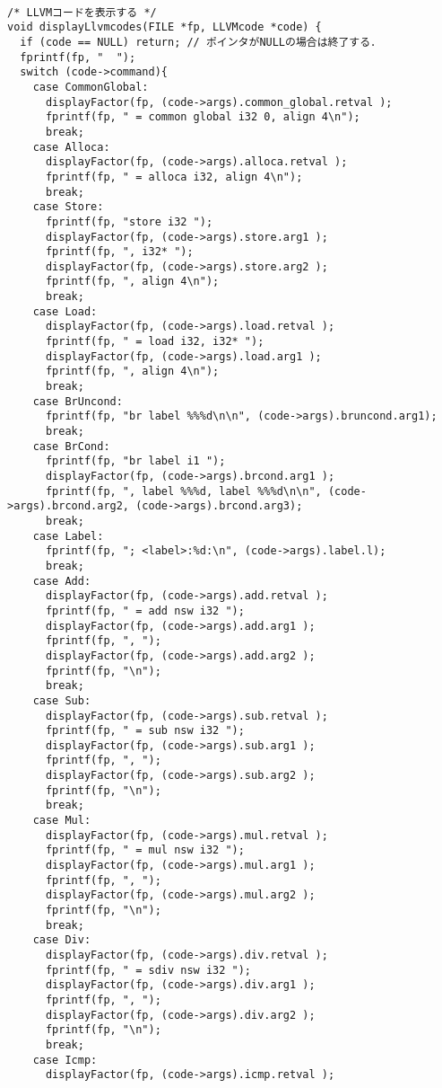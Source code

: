 \documentclass[uplatex]{jsarticle}
\begin{document}
\begin{lstlisting}[caption=displayLlvmcodes関数の定義,label=lst:ex4:llvm.c:displayLlvmcodes]

/* LLVMコードを表示する */
void displayLlvmcodes(FILE *fp, LLVMcode *code) {
  if (code == NULL) return; // ポインタがNULLの場合は終了する．
  fprintf(fp, "  ");
  switch (code->command){
    case CommonGlobal:
      displayFactor(fp, (code->args).common_global.retval );
      fprintf(fp, " = common global i32 0, align 4\n");
      break;
    case Alloca:
      displayFactor(fp, (code->args).alloca.retval );
      fprintf(fp, " = alloca i32, align 4\n");
      break;
    case Store:
      fprintf(fp, "store i32 ");
      displayFactor(fp, (code->args).store.arg1 );
      fprintf(fp, ", i32* ");
      displayFactor(fp, (code->args).store.arg2 );
      fprintf(fp, ", align 4\n");
      break;
    case Load:
      displayFactor(fp, (code->args).load.retval );
      fprintf(fp, " = load i32, i32* ");
      displayFactor(fp, (code->args).load.arg1 );
      fprintf(fp, ", align 4\n");
      break;
    case BrUncond:
      fprintf(fp, "br label %%%d\n\n", (code->args).bruncond.arg1);
      break;
    case BrCond:
      fprintf(fp, "br label i1 ");
      displayFactor(fp, (code->args).brcond.arg1 );
      fprintf(fp, ", label %%%d, label %%%d\n\n", (code->args).brcond.arg2, (code->args).brcond.arg3);
      break;
    case Label:
      fprintf(fp, "; <label>:%d:\n", (code->args).label.l);
      break;
    case Add:
      displayFactor(fp, (code->args).add.retval );
      fprintf(fp, " = add nsw i32 ");
      displayFactor(fp, (code->args).add.arg1 );
      fprintf(fp, ", ");
      displayFactor(fp, (code->args).add.arg2 );
      fprintf(fp, "\n");
      break;
    case Sub:
      displayFactor(fp, (code->args).sub.retval );
      fprintf(fp, " = sub nsw i32 ");
      displayFactor(fp, (code->args).sub.arg1 );
      fprintf(fp, ", ");
      displayFactor(fp, (code->args).sub.arg2 );
      fprintf(fp, "\n");
      break;
    case Mul:
      displayFactor(fp, (code->args).mul.retval );
      fprintf(fp, " = mul nsw i32 ");
      displayFactor(fp, (code->args).mul.arg1 );
      fprintf(fp, ", ");
      displayFactor(fp, (code->args).mul.arg2 );
      fprintf(fp, "\n");
      break;
    case Div:
      displayFactor(fp, (code->args).div.retval );
      fprintf(fp, " = sdiv nsw i32 ");
      displayFactor(fp, (code->args).div.arg1 );
      fprintf(fp, ", ");
      displayFactor(fp, (code->args).div.arg2 );
      fprintf(fp, "\n");
      break;
    case Icmp:
      displayFactor(fp, (code->args).icmp.retval );

\end{lstlisting}
\end{document}
